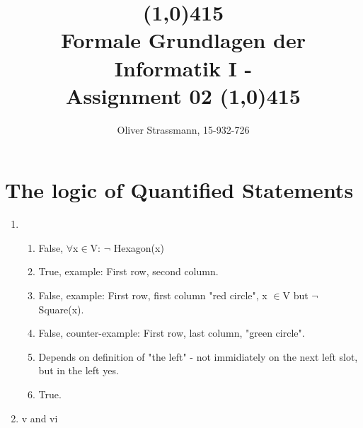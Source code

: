 \documentclass{article}
\title{ \line(1,0){415} \\ Formale Grundlagen der Informatik I -\\ Assignment 02 
\line(1,0){415}}
\author{Oliver Strassmann, 15-932-726}
\begin{document}
\maketitle

\section{The logic of Quantified Statements}
\begin{enumerate}[label=\alph*)]
	\item 
			\begin{enumerate}[label=\roman*.]
				\item False, $\forall$x$\in$V: $\neg$ Hexagon(x)
				\item True, example: First row, second column.
				\item False, example: First row, first column "red circle", x $\in$V but $\neg$Square(x).
				\item False, counter-example: First row, last column, "green circle".
				\item Depends on definition of "the left" - not immidiately on the next left slot, but in the left yes.
				\item True.
			\end{enumerate}

		\item v and vi 
\end{enumerate}
\end{document}
